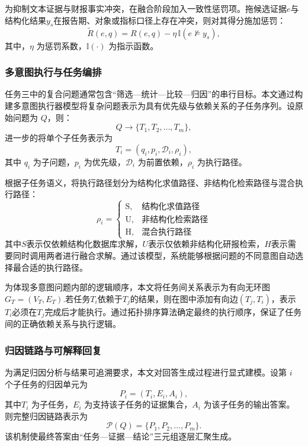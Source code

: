 \documentclass[withoutpreface,bwprint]{cumcmthesis} %
\begin{document}
为抑制文本证据与财报事实冲突，在融合阶段加入一致性惩罚项。拖候选证据$e$与结构化结果$y_s$在报告期、对象或指标口径上存在冲突，则对其得分施加惩罚：
\begin{equation}
	\widetilde{R}(e,q)=R(e,q)-\eta \, \mathbb{I}(e \not\models y_s),
	\tag{5-15}
\end{equation}
其中，$\eta$ 为惩罚系数，$\mathbb{I}(\cdot)$ 为指示函数。

\subsubsection{多意图执行与任务编排}
任务三中的复合问题通常包含“筛选—统计—比较—归因”的串行目标。本文通过构建多意图执行器模型将复杂问题表示为具有优先级与依赖关系的子任务序列。设原始问题为 $Q$，则：
\begin{equation}
	Q \rightarrow \{T_1,T_2,\ldots,T_m\},
	\tag{5-16}
\end{equation}
进一步的将单个子任务表示为
\begin{equation}
	T_i=(q_i,p_i,\mathcal{D}_i,\rho_i),
	\tag{5-17}
\end{equation}
其中 $q_i$ 为子问题，$p_i$ 为优先级，$\mathcal{D}_i$ 为前置依赖，$\rho_i$ 为执行路径。

根据子任务语义，将执行路径划分为结构化求值路径、非结构化检索路径与混合执行路径：
\begin{equation}
	\rho_i=
	\begin{cases}
		\mathrm{S}, & \text{结构化求值路径}  \\
		\mathrm{U}, & \text{非结构化检索路径} \\
		\mathrm{H}, & \text{混合执行路径}
	\end{cases}
	\tag{5-18}
\end{equation}
其中$S$表示仅依赖结构化数据库求解，$U$表示仅依赖非结构化研报检索，$H$表示需要同时调用两者进行融合求解。通过该模型，系统能够根据问题的不同意图自动选择最合适的执行路径。

为体现多意图问题内部的逻辑顺序，本文将任务间关系表示为有向无环图$G_T=(V_T,E_T)$.若任务$T_i$依赖于$T_j$的结果，则在图中添加有向边$(T_j,T_i)$，表示$T_i$必须在$T_j$完成后才能执行。通过拓扑排序算法确定最终的执行顺序，保证了任务间的正确依赖关系与执行逻辑。

\subsubsection{归因链路与可解释回复}
为满足归因分析与结果可追溯要求，本文对回答生成过程进行显式建模。设第 $i$ 个子任务的归因单元为
\begin{equation}
	P_i=(T_i,E_i,A_i),
	\tag{5-19}
\end{equation}
其中$T_i$ 为子任务，$E_i$ 为支持该子任务的证据集合，$A_i$ 为该子任务的输出答案。
则完整归因链路表示为
\begin{equation}
	\mathcal{P}(Q)=\{P_1,P_2,\ldots,P_m\}.
	\tag{5-20}
\end{equation}
该机制使最终答案由“任务—证据—结论”三元组逐层汇聚生成。
\end{document}
